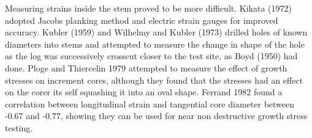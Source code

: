 Measuring strains inside the stem proved to be more difficult. Kikata (1972)
adopted Jacobs planking method and electric strain gauges for improved accuracy.
Kubler (1959) and Wilhelmy and Kubler (1973) drilled holes of known diameters into stems and
attempted to measure the change in shape of the hole as the log was successively
crosscut closer to the test site, as Boyd (1950) had done. Ploge and Thiercelin
1979 attempted to measure the effect of growth stresses on increment cores,
although they found that the stresses had an effect on the corer its self
squashing it into an oval shape. Ferrand 1982 found a correlation between
longitudinal strain and tangential core diameter between -0.67 and -0.77, showing
they can be used for near non destructive growth stress testing.